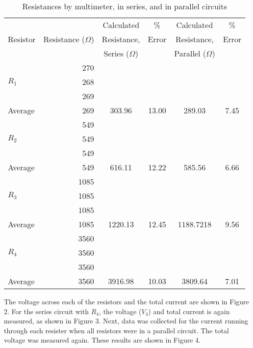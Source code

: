 \documentclass [12pt, letterpaper, twoside] {article}
\begin{document}
\begin{table}
  \centering
  \begin{tabular}{| l | r | c | c | c | c |}
    \hline\hline
    \multirow {3}{*}{Resistor} & & Calculated & \% & Calculated & \% \\
    & Resistance (\(\Omega\)) & Resistance, & Error & Resistance, & Error \\
    & & Series (\(\Omega\)) & & Parallel (\(\Omega\)) & \\
    \hline
    \multirow {3}{*}{\(R_{1}\)} & 270 & & & & \\
    & 268 & & & & \\
    & 269 & & & & \\
    \hline
    Average & 269 & 303.96 & 13.00 & 289.03 & 7.45 \\ %
    \hline
    \multirow {3}{*}{\(R_{2}\)} & 549 & & & & \\
    & 549 & & & & \\
    & 549 & & & & \\
    \hline
    Average & 549 & 616.11 & 12.22 & 585.56 & 6.66 \\ %
    \hline
    \multirow {3}{*}{\(R_{3}\)} & 1085 & & & & \\
    & 1085 & & & & \\
    & 1085 & & & & \\
    \hline
    Average & 1085 & 1220.13 & 12.45 & 1188.7218 & 9.56 \\ %
    \hline
    \multirow {3}{*}{\(R_{4}\)} & 3560 & & & & \\
    & 3560 & & & & \\
    & 3560 & & & & \\
    \hline
    Average & 3560 & 3916.98 & 10.03 & 3809.64 & 7.01 \\ %
    \hline\hline
  \end{tabular}
  \caption{Resistances by multimeter, in series, and in parallel circuits}
\end{table}

\noindent
The voltage across each of the resistors and the total current are shown in Figure 2. For the series circuit with \(R_{4}\), the voltage (\(V_{4}\)) and total current is again measured, as shown in Figure 3. Next, data was collected for the current running through each resister when all resistors were in a parallel circuit. The total voltage was measured again. These results are shown in Figure 4.
\end{document}
